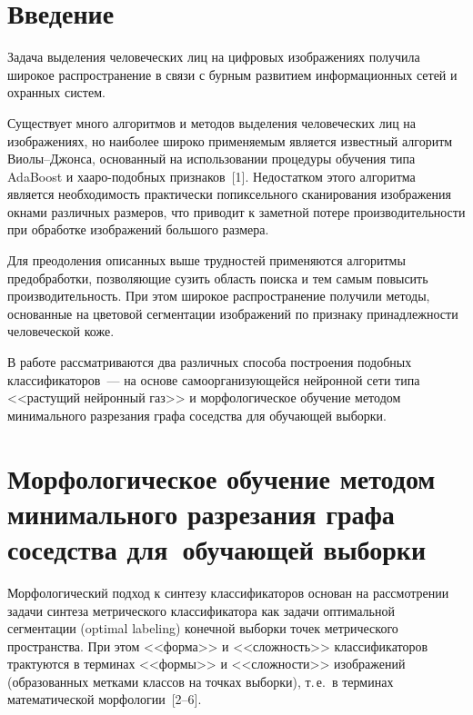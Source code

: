       \begin{multicols}{2}

            \label{st\stat}


\section{Введение}

      Задача выделения человеческих лиц на цифровых изображениях получила широкое 
распространение в связи с бурным развитием информационных сетей и охранных систем. 

Существует много алгоритмов и методов выделения человеческих лиц на изображениях, но 
наиболее широко применяемым является известный алгоритм Вио\-лы--Джон\-са, основанный на 
использовании процедуры обучения типа AdaBoost и хааро-по\-доб\-ных признаков~[1]. 
Недостатком этого алгоритма является необходимость практически попиксельного сканирования 
изображения окнами различных размеров, что приводит к заметной потере про\-из\-во\-ди\-тель\-ности 
при обработке изображений большого размера. 

Для преодоления описанных выше трудностей 
применяются алгоритмы предобработки, позволяющие сузить область поиска и тем самым 
повысить производительность. При этом широкое распространение получили методы, основанные 
на цветовой сегментации изображений по признаку принадлежности человеческой коже.
      
      В работе рассматриваются два различных способа построения подобных 
      классификаторов~--- на основе самоорганизующейся нейронной сети типа <<растущий 
нейронный газ>> и морфологическое обучение методом минимального разрезания графа 
соседства для обучающей выборки.

\section{Морфологическое обучение методом минимального разрезания графа 
соседства для~обучающей выборки}

\vspace*{-1pt}
      
      Морфологический подход к синтезу классификаторов основан на рассмотрении задачи 
синтеза метрического классификатора как задачи оптимальной сегментации (optimal labeling) 
конечной выборки точек метрического пространства. При этом <<форма>> и <<сложность>> 
классификаторов трактуются в терминах <<формы>> и <<сложности>> изоб\-ра\-же\-ний 
(образованных метками классов на точках выборки), т.\,е.\ в терминах математической 
морфологии~[2--6]. %
      

\end{multicols}
